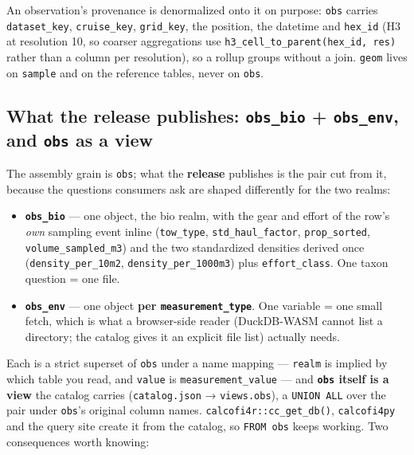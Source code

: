 \documentclass[
  letterpaper,
  DIV=11,
  numbers=noendperiod]{scrreprt}
\providecommand{\tightlist}{%
  \setlength{\itemsep}{0pt}\setlength{\parskip}{0pt}}
\begin{document}
An observation's provenance is denormalized onto it on purpose:
\texttt{obs} carries \texttt{dataset\_key}, \texttt{cruise\_key},
\texttt{grid\_key}, the position, the datetime and \texttt{hex\_id} (H3
at resolution 10, so coarser aggregations use
\texttt{h3\_cell\_to\_parent(hex\_id,\ res)} rather than a column per
resolution), so a rollup groups without a join. \texttt{geom} lives on
\texttt{sample} and on the reference tables, never on \texttt{obs}.

\subsection{\texorpdfstring{What the release publishes:
\texttt{obs\_bio} + \texttt{obs\_env}, and \texttt{obs} as a
view}{What the release publishes: obs\_bio + obs\_env, and obs as a view}}\label{what-the-release-publishes-obs_bio-obs_env-and-obs-as-a-view}

The assembly grain is \texttt{obs}; what the \textbf{release} publishes
is the pair cut from it, because the questions consumers ask are shaped
differently for the two realms:

\begin{itemize}
\tightlist
\item
  \textbf{\texttt{obs\_bio}} --- one object, the bio realm, with the
  gear and effort of the row's \emph{own} sampling event inline
  (\texttt{tow\_type}, \texttt{std\_haul\_factor},
  \texttt{prop\_sorted}, \texttt{volume\_sampled\_m3}) and the two
  standardized densities derived once (\texttt{density\_per\_10m2},
  \texttt{density\_per\_1000m3}) plus \texttt{effort\_class}. One taxon
  question = one file.
\item
  \textbf{\texttt{obs\_env}} --- one object \textbf{per
  \texttt{measurement\_type}}. One variable = one small fetch, which is
  what a browser-side reader (DuckDB-WASM cannot list a directory; the
  catalog gives it an explicit file list) actually needs.
\end{itemize}

Each is a strict superset of \texttt{obs} under a name mapping ---
\texttt{realm} is implied by which table you read, and \texttt{value} is
\texttt{measurement\_value} --- and \textbf{\texttt{obs} itself is a
view} the catalog carries (\texttt{catalog.json} → \texttt{views.obs}),
a \texttt{UNION\ ALL} over the pair under \texttt{obs}'s original column
names. \texttt{calcofi4r::cc\_get\_db()}, \texttt{calcofi4py} and the
query site create it from the catalog, so \texttt{FROM\ obs} keeps
working. Two consequences worth knowing:
\end{document}
